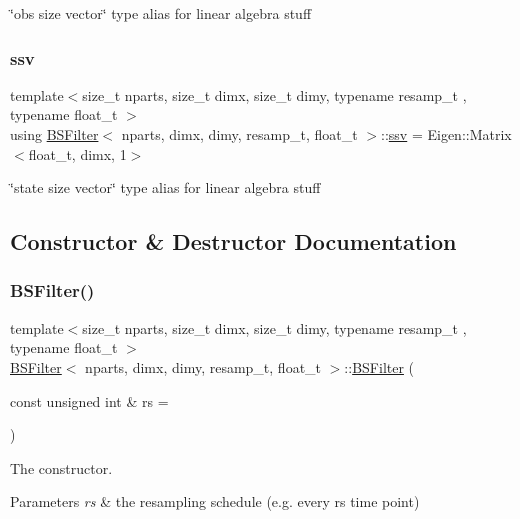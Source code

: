 \char`\"{}obs size vector\char`\"{} type alias for linear algebra stuff \mbox{\label{classBSFilter_a0b5bc93957fb6b6b1282f31fa2e01c3c}} 
\subsubsection{\texorpdfstring{ssv}{ssv}}
{\footnotesize\ttfamily template$<$size\+\_\+t nparts, size\+\_\+t dimx, size\+\_\+t dimy, typename resamp\+\_\+t , typename float\+\_\+t $>$ \\
using \hyperlink{classBSFilter}{B\+S\+Filter}$<$ nparts, dimx, dimy, resamp\+\_\+t, float\+\_\+t $>$\+::\hyperlink{classBSFilter_a0b5bc93957fb6b6b1282f31fa2e01c3c}{ssv} =  Eigen\+::\+Matrix$<$float\+\_\+t, dimx, 1$>$}

\char`\"{}state size vector\char`\"{} type alias for linear algebra stuff 

\subsection{Constructor \& Destructor Documentation}
\mbox{\label{classBSFilter_a49614246ae7b55b04b9e232cd4fb6bc1}} 
\subsubsection{\texorpdfstring{B\+S\+Filter()}{BSFilter()}}
{\footnotesize\ttfamily template$<$size\+\_\+t nparts, size\+\_\+t dimx, size\+\_\+t dimy, typename resamp\+\_\+t , typename float\+\_\+t $>$ \\
\hyperlink{classBSFilter}{B\+S\+Filter}$<$ nparts, dimx, dimy, resamp\+\_\+t, float\+\_\+t $>$\+::\hyperlink{classBSFilter}{B\+S\+Filter} (\begin{DoxyParamCaption}\item[{const unsigned int \&}]{rs = {} }\end{DoxyParamCaption})}



The constructor. 


\begin{DoxyParams}{Parameters}
{\em rs} & the resampling schedule (e.\+g. every rs time point) \\
\hline
\end{DoxyParams}


